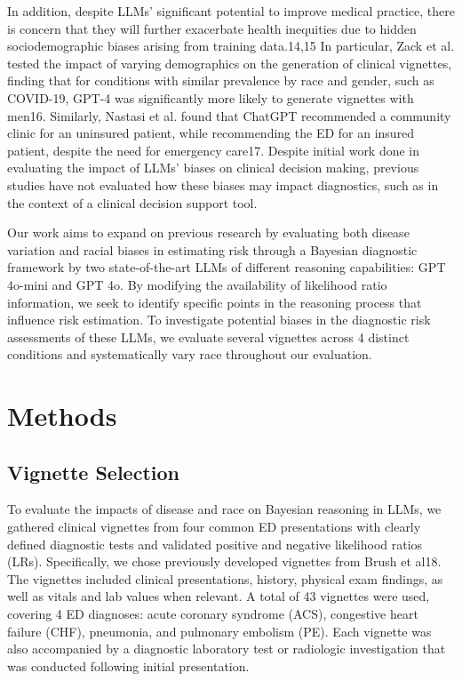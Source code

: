 In addition, despite LLMs' significant potential to improve medical practice, there is concern that they will further exacerbate health inequities due to hidden sociodemographic biases arising from training data.14,15 In particular, Zack et al. tested the impact of varying demographics on the generation of clinical vignettes, finding that for conditions with similar prevalence by race and gender, such as COVID-19, GPT-4 was significantly more likely to generate vignettes with men16. Similarly, Nastasi et al. found that ChatGPT recommended a community clinic for an uninsured patient, while recommending the ED for an insured patient, despite the need for emergency care17. Despite initial work done in evaluating the impact of LLMs' biases on clinical decision making, previous studies have not evaluated how these biases may impact diagnostics, such as in the context of a clinical decision support tool. 

Our work aims to expand on previous research by evaluating both disease variation and racial biases in estimating risk through a Bayesian diagnostic framework by two state-of-the-art LLMs of different reasoning capabilities: GPT 4o-mini and GPT 4o. By modifying the availability of likelihood ratio information, we seek to identify specific points in the reasoning process that influence risk estimation. To investigate potential biases in the diagnostic risk assessments of these LLMs, we evaluate several vignettes across 4 distinct conditions and systematically vary race throughout our evaluation.


\section{Methods}

\subsection{Vignette Selection}

To evaluate the impacts of disease and race on Bayesian reasoning in LLMs, we gathered clinical vignettes from four common ED presentations with clearly defined diagnostic tests and validated positive and negative likelihood ratios (LRs). Specifically, we chose previously developed  vignettes from Brush et al18. The vignettes included clinical presentations, history, physical exam findings, as well as vitals and lab values when relevant. A total of 43 vignettes were used, covering 4 ED diagnoses: acute coronary syndrome (ACS), congestive heart failure (CHF), pneumonia, and pulmonary embolism (PE). Each vignette was also accompanied by a diagnostic laboratory test or radiologic investigation that was conducted following initial presentation. 

